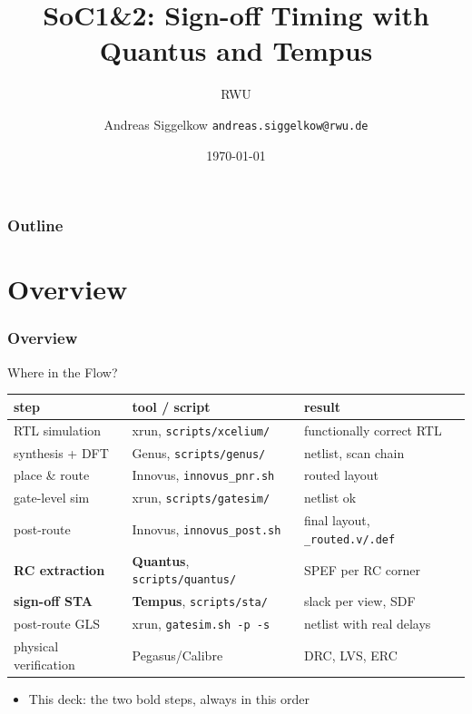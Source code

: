 \documentclass{beamer}
\title{SoC1\&2: Sign-off Timing with Quantus and Tempus}
\author[AS]{Andreas Siggelkow \newline \texttt{andreas.siggelkow@rwu.de}}
\date[2026]{\today}
\subtitle{RWU}
\institute{Elektrotechnik und Informatik}
\newcommand{\astitle}{nix}
\newcommand{\assubtitle}{nix}
\newcommand{\cmd}[1]{\texttt{#1}}
\begin{document}
\setcounter{tocdepth}{1}

\begin{frame}
  \titlepage
\end{frame}

\begin{frame}
  \frametitle{Outline}
  \tableofcontents
\end{frame}

\section{Overview}
\renewcommand{\astitle}{Overview}

\renewcommand{\assubtitle}{Where in the Flow?}
\begin{frame}
\frametitle{\astitle}
\begin{block}{\assubtitle}
  \footnotesize
  \begin{tabularx}{\linewidth}{@{}llY@{}}
    \textbf{step} & \textbf{tool / script} & \textbf{result}\\\hline
    RTL simulation      & xrun, \cmd{scripts/xcelium/}   & functionally correct RTL\\
    synthesis + DFT     & Genus, \cmd{scripts/genus/}    & netlist, scan chain\\
    place \& route      & Innovus, \cmd{innovus\_pnr.sh}  & routed layout\\
    gate-level sim      & xrun, \cmd{scripts/gatesim/}   & netlist ok\\
    post-route          & Innovus, \cmd{innovus\_post.sh} & final layout, \cmd{\_routed.v/.def}\\
    \textbf{RC extraction} & \textbf{Quantus}, \cmd{scripts/quantus/} & SPEF per RC corner\\
    \textbf{sign-off STA}  & \textbf{Tempus}, \cmd{scripts/sta/}      & slack per view, SDF\\
    post-route GLS      & xrun, \cmd{gatesim.sh -p -s}   & netlist with real delays\\
    physical verification & Pegasus/Calibre             & DRC, LVS, ERC\\
  \end{tabularx}
  \vspace{4pt}
  \begin{itemize}
    \item This deck: the two bold steps, always in this order
  \end{itemize}
\end{block}
\end{frame}
\end{document}
